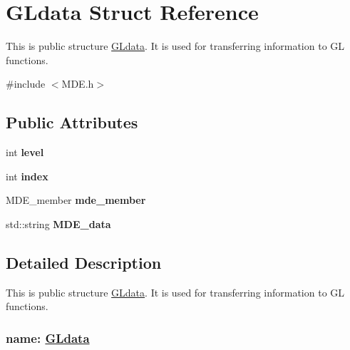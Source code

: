 \hypertarget{structGLdata}{}\section{G\+Ldata Struct Reference}
\label{structGLdata}


This is public structure \textquotesingle{}\hyperlink{structGLdata}{G\+Ldata}\textquotesingle{}. It is used for transferring information to GL functions.  




{\ttfamily \#include $<$M\+D\+E.\+h$>$}

\subsection*{Public Attributes}
\begin{DoxyCompactItemize}
\item 
int {\bfseries level}\hypertarget{structGLdata_a9fb5353e3780e6048f8d1e4efc63bde3}{}\label{structGLdata_a9fb5353e3780e6048f8d1e4efc63bde3}

\item 
int {\bfseries index}\hypertarget{structGLdata_a92bab0003aa1bfd36dfc9bacda7575fc}{}\label{structGLdata_a92bab0003aa1bfd36dfc9bacda7575fc}

\item 
M\+D\+E\+\_\+member {\bfseries mde\+\_\+member}\hypertarget{structGLdata_af17d1c207ffb8b25207b94a8f33f42ae}{}\label{structGLdata_af17d1c207ffb8b25207b94a8f33f42ae}

\item 
std\+::string {\bfseries M\+D\+E\+\_\+data}\hypertarget{structGLdata_a9b7ad0c7db452265a86cf8339d3510d4}{}\label{structGLdata_a9b7ad0c7db452265a86cf8339d3510d4}

\end{DoxyCompactItemize}


\subsection{Detailed Description}
This is public structure \textquotesingle{}\hyperlink{structGLdata}{G\+Ldata}\textquotesingle{}. It is used for transferring information to GL functions. 

\subsubsection*{name\+: \hyperlink{structGLdata}{G\+Ldata}}


